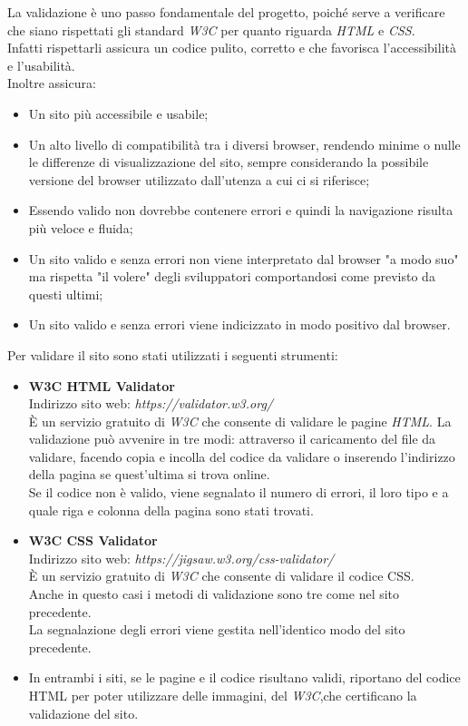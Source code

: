 La validazione è uno passo fondamentale del progetto, poiché serve a verificare che siano rispettati gli standard \emph{W3C} per quanto riguarda \emph{HTML} e \emph{CSS}.\\
Infatti rispettarli assicura un codice pulito, corretto e che favorisca l'accessibilità e l'usabilità.\\
Inoltre assicura:
\begin{itemize}
	\item Un sito più accessibile e usabile;
	\item Un alto livello di compatibilità tra i diversi browser, rendendo minime o nulle le differenze di visualizzazione del sito, sempre considerando la possibile versione del browser utilizzato dall'utenza a cui ci si riferisce;
	\item Essendo valido non dovrebbe contenere errori e quindi la navigazione risulta più veloce e fluida;
	\item Un sito valido e senza errori non viene interpretato dal browser "a modo suo" ma rispetta "il volere" degli sviluppatori comportandosi come previsto da questi ultimi; %
	\item Un sito valido e senza errori viene indicizzato in modo positivo dal browser.  %
\end{itemize}
Per validare il sito sono stati utilizzati i seguenti strumenti:
\begin{itemize}
	\item \textbf{W3C HTML Validator}\\
	Indirizzo sito web: \emph{https://validator.w3.org/}\\
	È un servizio gratuito di \emph{W3C} che consente di validare le pagine \emph{HTML}.
	La validazione può avvenire in tre modi: attraverso il caricamento del file da validare, facendo copia e incolla del codice da validare o inserendo l'indirizzo della pagina se quest'ultima si trova online.\\
Se il codice non è valido, viene segnalato il numero di errori, il loro tipo e a quale riga e colonna della pagina sono stati trovati.
	\item \textbf{W3C CSS Validator}\\
	Indirizzo sito web: \emph{https://jigsaw.w3.org/css-validator/}\\
	È un servizio gratuito di \emph{W3C} che consente di validare il codice CSS.\\
	Anche in questo casi i metodi di validazione sono tre come nel sito precedente.\\
	La segnalazione degli errori viene gestita nell'identico modo del sito precedente.\\
	 \item In entrambi i siti, se le pagine e il codice risultano validi, riportano del codice HTML per poter utilizzare delle immagini, del \emph{W3C},che certificano la validazione del sito.
\end{itemize}